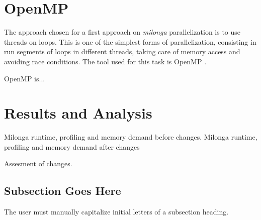 \documentclass[review]{elsarticle}
\begin{document}

\section{OpenMP}

The approach chosen for a first approach on \textit{milonga} parallelization
is to use threads on loops. This is one of the simplest forms of parallelization,
consisting in run segments of loops in different threads, taking care of memory
access and avoiding race conditions. The tool used for this task is OpenMP
\cite{Dagum1998}.

OpenMP is...



\section{Results and Analysis}

Milonga runtime, profiling and memory demand before changes.
Milonga runtime, profiling and memory demand after changes

Assesment of changes.

\subsection{Subsection Goes Here}
The user must manually capitalize initial letters of a subsection heading.
\end{document}
